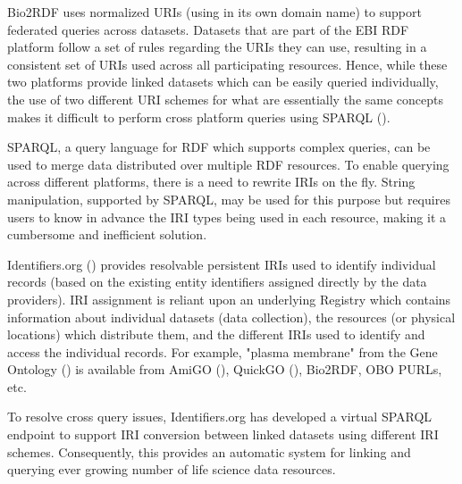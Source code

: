 \documentclass{bioinfo}
\begin{document}
Bio2RDF uses normalized URIs (using in its own domain name) to support federated queries across datasets. Datasets that are part of the EBI RDF platform follow a set of rules regarding the URIs they can use, resulting in a consistent set of URIs used across all participating resources. Hence, while these two platforms provide linked datasets which can be easily queried individually, the use of two different URI schemes for what are essentially the same concepts makes it difficult to perform cross platform queries using SPARQL (\cite{Prud'hommeaux2008}).  

SPARQL, a query language for RDF which supports complex queries, can be used to merge data distributed over multiple RDF resources. To enable querying across different platforms, there is a need to rewrite IRIs on the fly. String manipulation, supported by SPARQL, may be used for this purpose but requires users to know in advance the IRI types being used in each resource, making it a cumbersome and inefficient solution. 

Identifiers.org (\cite{Juty01012012}) provides resolvable persistent IRIs used to identify individual records (based on the existing entity identifiers assigned directly by the data providers). IRI assignment is reliant upon an underlying Registry which contains information about individual datasets (data collection), the resources (or physical locations) which distribute them, and the different IRIs used to identify and access the individual records. For example, "plasma membrane" from the Gene Ontology (\cite{Ashburner2000}) is available from AmiGO (\cite{Carbon2009}), QuickGO (\cite{Binns2009}), Bio2RDF, OBO PURLs, etc.

To resolve cross query issues, Identifiers.org has developed a virtual SPARQL endpoint to support IRI conversion between linked datasets using different IRI schemes. Consequently, this provides an automatic system for linking and querying ever growing number of life science data resources.

\end{document}
